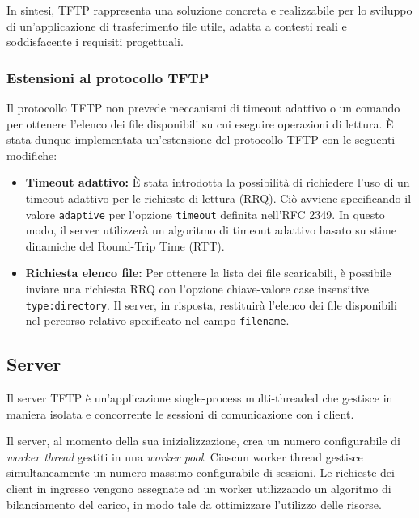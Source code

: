 \documentclass[12pt]{article}
\begin{document}
{In sintesi, TFTP rappresenta una soluzione concreta e realizzabile per lo sviluppo di un'applicazione di trasferimento file utile, adatta a contesti reali e soddisfacente i requisiti progettuali.

\subsubsection{Estensioni al protocollo TFTP}

Il protocollo TFTP non prevede meccanismi di timeout adattivo o un comando per ottenere l'elenco dei file disponibili su cui eseguire operazioni di lettura.
È stata dunque implementata un'estensione del protocollo TFTP con le seguenti modifiche:

\begin{itemize}
    \item \textbf{Timeout adattivo:} È stata introdotta la possibilità di richiedere l'uso di un timeout adattivo per le richieste di lettura (RRQ). Ciò avviene specificando il valore \texttt{adaptive} per l'opzione \texttt{timeout} definita nell'RFC 2349. In questo modo, il server utilizzerà un algoritmo di timeout adattivo basato su stime dinamiche del Round-Trip Time (RTT).
    
    \item \textbf{Richiesta elenco file:} Per ottenere la lista dei file scaricabili, è possibile inviare una richiesta RRQ con l'opzione chiave-valore case insensitive \texttt{type:directory}.
    Il server, in risposta, restituirà l'elenco dei file disponibili nel percorso relativo specificato nel campo \texttt{filename}.
\end{itemize}

\subsection{Server}

Il server TFTP è un'applicazione single-process multi-threaded che gestisce in maniera isolata e concorrente le sessioni di comunicazione con i client.

Il server, al momento della sua inizializzazione, crea un numero configurabile di \emph{worker thread} gestiti in una \emph{worker pool}.
Ciascun worker thread gestisce simultaneamente un numero massimo configurabile di sessioni.
Le richieste dei client in ingresso vengono assegnate ad un worker utilizzando un algoritmo di bilanciamento del carico, in modo tale da ottimizzare l'utilizzo delle risorse.

}
\end{document}
